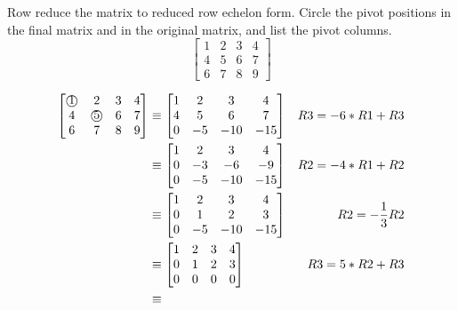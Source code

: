 \documentclass{mathhomework}
\newcommand{\circnum}[1]{\text{\textcircled{#1}}}
\begin{document}
\begin{problem}[1.2\#3]
    Row reduce the matrix to reduced row echelon form. Circle the pivot positions in the final matrix and in the original matrix, and list the pivot columns.
    $$\begin{bmatrix}
        1 & 2 & 3 & 4 \\
        4 & 5 & 6 & 7 \\
        6 & 7 & 8 & 9
    \end{bmatrix}$$

    \begin{solution}
        \begin{align*}
            \begin{bmatrix}
                \circnum{1} & 2 & 3 & 4 \\
                4 & \circnum{5} & 6 & 7 \\
                6 & 7 & 8 & 9
            \end{bmatrix}
            & \equiv
            \begin{bmatrix}
                1 & 2 & 3 & 4 \\
                4 & 5 & 6 & 7 \\
                0 & -5 & -10 & -15
            \end{bmatrix}
            & R3 = -6 * R1 + R3 \\ & \equiv
            \begin{bmatrix}
                1 & 2 & 3 & 4 \\
                0 & -3 & -6 & -9 \\
                0 & -5 & -10 & -15
            \end{bmatrix}
            & R2 = -4 * R1 + R2 \\ & \equiv
            \begin{bmatrix}
                1 & 2 & 3 & 4 \\
                0 & 1 & 2 & 3 \\
                0 & -5 & -10 & -15
            \end{bmatrix}
            & R2 = -\frac{1}{3} R2 \\ & \equiv
            \begin{bmatrix}
                1 & 2 & 3 & 4 \\
                0 & 1 & 2 & 3 \\
                0 & 0 & 0 & 0
            \end{bmatrix}
            & R3 = 5 * R2 + R3 \\ & \equiv

\end{align*}
\end{solution}
\end{problem}
\end{document}
